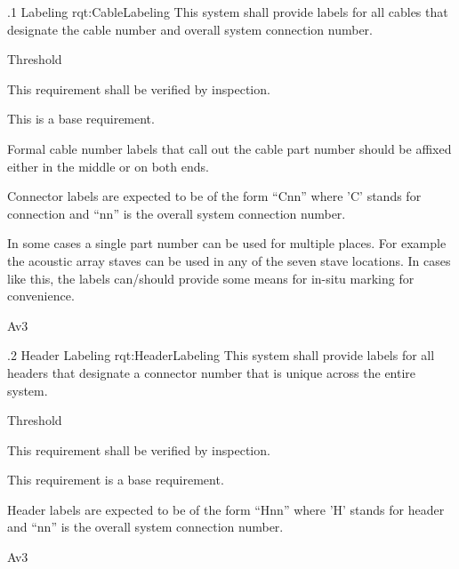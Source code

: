 \ONERQMTV
{\RqtNumberBase.1}
{Labeling}
{rqt:CableLabeling}
{
This system shall provide labels for all cables that designate the cable number and overall system connection number.
}
{
	\item [Phase 1] Threshold
}
{This requirement shall be verified by inspection.}
{
	\item [N/A] This is a base requirement.
}
{
	\item Formal cable number labels that call out the cable part number should be affixed either in the middle or on both ends.
	\item Connector labels are expected to be of the form ``Cnn'' where 'C' stands for connection and ``nn'' is the overall system connection number.
	\item In some cases a single part number can be used for multiple places. For example the acoustic array staves can be used in any of the seven stave locations. In cases like this, the labels can/should provide some means for in-situ marking for convenience. 
}
{Av3}


\ONERQMTV
{\RqtNumberBase.2}
{Header Labeling}
{rqt:HeaderLabeling}
{
This system shall provide labels for all headers that designate a connector number that is unique across the entire system.
}
{
	\item [Phase 1] Threshold
}
{This requirement shall be verified by inspection.}
{
	\item [N/A] This requirement is a base requirement.
}
{
	\item Header labels are expected to be of the form ``Hnn'' where 'H' stands for header and ``nn'' is the overall system connection number.

}
{Av3}


